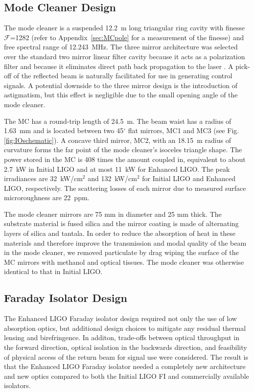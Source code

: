 \subsection{Mode Cleaner Design}
The mode cleaner is a suspended 12.2~m long triangular ring cavity
with finesse $\mathcal{F}$=1282 (refer to Appendix~\ref{sec:MCpole}
for a measurement of the finesse) and free spectral range of
12.243~MHz. The three mirror architecture was selected over the
standard two mirror linear filter cavity because it acts as a
polarization filter and because it eliminates direct path back
propagation to the laser \citep{Raab1992Estimation}. A pick-off of the
reflected beam is naturally facilitated for use in generating control
signals. A potential downside to the three mirror design is the
introduction of astigmatism, but this effect is negligible due to the
small opening angle of the mode cleaner. 

The MC has a round-trip length of 24.5~m. The beam waist has a radius of
1.63~mm and is located between two 45$^\circ$ flat mirrors, MC1 and
MC3 (see Fig. \ref{fig:IOschematic}). A concave third mirror, MC2,
with an 18.15~m radius of curvature forms the far point of the mode
cleaner's isoceles triangle shape. The power stored in the MC is 408
times the amount coupled in, equivalent to about 2.7~kW in Initial
LIGO and at most 11~kW for Enhanced LIGO. The peak irradiances are
32~kW/cm$^2$ and 132~kW/cm$^2$ for Initial LIGO and Enhanced LIGO,
respectively. The scattering losses of each mirror due to measured
surface microroughness are 22~ppm.

The mode cleaner mirrors are 75 mm in diameter and 25 mm thick. The
substrate material is fused silica and the mirror coating is made of
alternating layers of silica and tantala. In order to reduce the
absorption of heat in these materials and therefore improve the
transmission and modal quality of the beam in the mode cleaner, we
removed particulate by drag wiping the surface of the MC mirrors with
methanol and optical tissues. The mode cleaner was otherwise identical
to that in Initial LIGO.



\subsection{Faraday Isolator Design}
The Enhanced LIGO Faraday isolator design required not only the use of
low absorption optics, but additional design choices to mitigate any
residual thermal lensing and birefringence. In additon, trade-offs
between optical throughput in the forward direction, optical isolation
in the backwards direction, and feasibility of physical access of the
return beam for signal use were considered. The result is that the
Enhanced LIGO Faraday isolator needed a completely new architecture
and new optics compared to both the Initial LIGO FI and commercially
available isolators.

